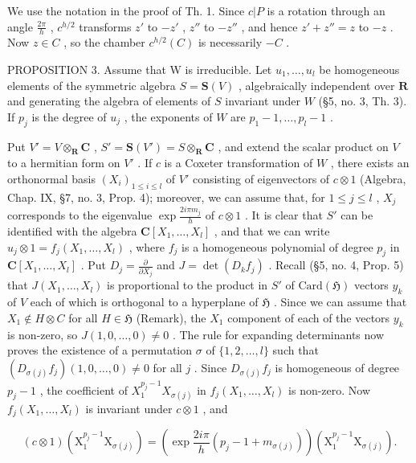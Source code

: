 We use the notation in the proof of Th. 1. Since \(c|P\) is a rotation through an angle \(\frac{2\pi}{h}\) , \(c^{h/2}\) transforms \(z'\) to \(-z'\) , \(z''\) to \(-z''\) , and hence \(z' + z'' = z\) to \(-z\) . Now \(z \in C\) , so the chamber \(c^{h/2}(C)\) is necessarily \(-C\) .

PROPOSITION 3. Assume that W is irreducible. Let \(u_1, \ldots, u_l\) be homogeneous elements of the symmetric algebra \(S = \mathbf{S}(V)\) , algebraically independent over \(\mathbf{R}\) and generating the algebra of elements of \(S\) invariant under \(W\) (§5, no. 3, Th. 3). If \(p_j\) is the degree of \(u_j\) , the exponents of \(W\) are \(p_1 - 1, \ldots, p_l - 1\) .

Put \(V' = V \otimes_{\mathbf{R}} \mathbf{C}\) , \(S' = \mathbf{S}(V') = S \otimes_{\mathbf{R}} \mathbf{C}\) , and extend the scalar product on \(V\) to a hermitian form on \(V'\) . If \(c\) is a Coxeter transformation of \(W\) , there exists an orthonormal basis \((X_i)_{1 \leqslant i \leqslant l}\) of \(V'\) consisting of eigenvectors of \(c \otimes 1\) (Algebra, Chap. IX, §7, no. 3, Prop. 4); moreover, we can assume that, for \(1 \leqslant j \leqslant l\) , \(X_j\) corresponds to the eigenvalue \(\exp \frac{2i\pi m_j}{h}\) of \(c \otimes 1\) . It is clear that \(S'\) can be identified with the algebra \(\mathbf{C}[X_1, \ldots, X_l]\) , and that we can write \(u_j \otimes 1 = f_j(X_1, \ldots, X_l)\) , where \(f_j\) is a homogeneous polynomial of degree \(p_j\) in \(\mathbf{C}[X_1, \ldots, X_l]\) . Put \(D_j = \frac{\partial}{\partial X_j}\) and \(J = \det(D_k f_j)\) . Recall (§5, no. 4, Prop. 5) that \(J(X_1, \ldots, X_l)\) is proportional to the product in \(S'\) of \(\text{Card}(\mathfrak{H})\) vectors \(y_k\) of \(V\) each of which is orthogonal to a hyperplane of \(\mathfrak{H}\) . Since we can assume that \(X_1 \notin H \otimes C\) for all \(H \in \mathfrak{H}\) (Remark), the \(X_1\) component of each of the vectors \(y_k\) is non-zero, so \(J(1, 0, \ldots, 0) \neq 0\) . The rule for expanding determinants now proves the existence of a permutation \(\sigma\) of \(\{1, 2, \ldots, l\}\) such that \((D_{\sigma(j)} f_j)(1, 0, \ldots, 0) \neq 0\) for all \(j\) . Since \(D_{\sigma(j)} f_j\) is homogeneous of degree \(p_j - 1\) , the coefficient of \(X_1^{p_j - 1} X_{\sigma(j)}\) in \(f_j(X_1, \ldots, X_l)\) is non-zero. Now \(f_j(X_1, \ldots, X_l)\) is invariant under \(c \otimes 1\) , and

\[
(c \otimes 1) (\mathrm{X} _ {1} ^ {p _ {j} - 1} \mathrm{X} _ {\sigma (j)}) = \left(\exp \frac {2 i \pi}{h} (p _ {j} - 1 + m _ {\sigma (j)})\right) (\mathrm{X} _ {1} ^ {p _ {j} - 1} \mathrm{X} _ {\sigma (j)}).
\]


